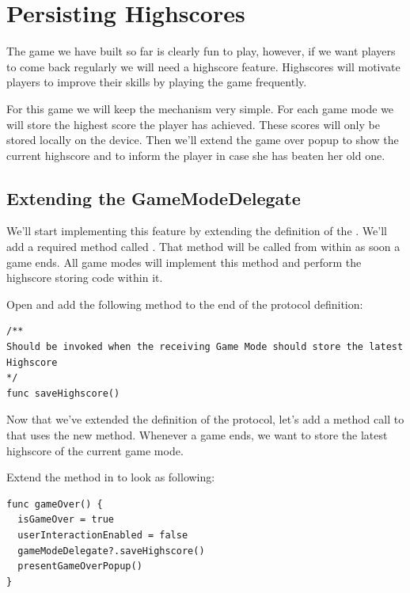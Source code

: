 \chapter{Persisting Highscores}
The game we have built so far is clearly fun to play, however, if we want
players to come back regularly we will need a highscore feature. Highscores will
motivate players to improve their skills by playing the game frequently.

For this game we will keep the mechanism very simple. For each game mode we will
store the highest score the player has achieved. These scores will only be
stored locally on the device. Then we'll extend the game over popup to show the
current highscore and to inform the player in case she has beaten her old one.

\section{Extending the GameModeDelegate}
We'll start implementing this feature by extending the definition of the
. We'll add a required method called
. That method will be called from within
 as soon a game ends. All game modes will implement this
method and perform the highscore storing code within it.

\begin{leftbar}
Open  and add the following method to the
end of the protocol definition:
\begin{lstlisting}
/**
Should be invoked when the receiving Game Mode should store the latest Highscore
*/
func saveHighscore()
\end{lstlisting}
\end{leftbar}

Now that we've extended the definition of the protocol, let's add a method call
to  that uses the new  method.
Whenever a game ends, we want to store the latest highscore of the current game
mode.

\begin{leftbar}
Extend the  method in  to look
as following:
\begin{lstlisting}
func gameOver() {
  isGameOver = true
  userInteractionEnabled = false
  gameModeDelegate?.saveHighscore()
  presentGameOverPopup()
}
\end{lstlisting}
\end{leftbar}


